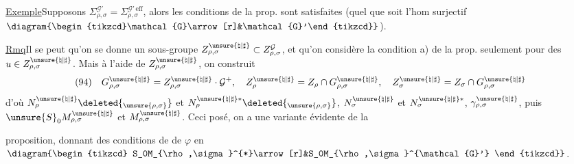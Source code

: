 \uline{Exemple}\quad Supposons
\(\Sigma_{\rho,\sigma}^{\mathcal{G}'}=\Sigma_{\rho,\sigma}^{\mathcal{G}'\,\mathrm{eff}}\),
alors les conditions de la prop. sont 
satisfaites (quel que soit l'hom surjectif
\(\diagram{\begin{tikzcd}\mathcal{G}\arrow[r]&\mathcal{G}'\end{tikzcd}}\)).

\uline{Rmq}\quad Il se peut qu'on se donne un sous-groupe
\(Z_{\rho,\sigma}^{\unsure{\natural|\sharp}}\subset Z_{\rho,\sigma}^{\mathcal{G}}\),
et qu'on considère  la condition a) de la prop.
seulement pour des \(u\in Z_{\rho,\sigma}^{\unsure{\natural|\sharp}}\).
Mais à l'aide de \(Z_{\rho,\sigma}^{\unsure{\natural|\sharp}}\), on construit
\[
(94)\quad
G_{\rho,\sigma}^{\unsure{\natural|\sharp}}=
Z_{\rho,\sigma}^{\unsure{\natural|\sharp}}\cdot\mathcal{G}^+,
\quad Z_\rho^{\unsure{\natural|\sharp}}=Z_\rho\cap G_{\rho,\sigma}^{\unsure{\natural|\sharp}},
\quad Z_\sigma^{\unsure{\natural|\sharp}}=Z_\sigma\cap G_{\rho,\sigma}^{\unsure{\natural|\sharp}}
\]
d'où \(N_\rho^{\unsure{\natural|\sharp}}\deleted{_{\unsure{\rho,\sigma}}}\)
et \(N_\rho^{\unsure{\natural|\sharp}*}\deleted{_{\unsure{\rho,\sigma}}}\),
\(N_\sigma^{\unsure{\natural|\sharp}}\) et
\(N_\sigma^{\unsure{\natural|\sharp}*}\),
\(\gamma_{\rho,\sigma}^{\unsure{\natural|\sharp}}\), puis
\(\unsure{S}_0M_{\rho,\sigma}^{\unsure{\natural|\sharp}}\) et
\(M_{\rho,\sigma}^{\unsure{\natural|\sharp}}\).
Ceci posé, on a une variante évidente de la


proposition, donnant des conditions de  de \(\varphi\) en
\(\diagram{\begin{tikzcd}
S_0M_{\rho,\sigma}^{*}\arrow[r]&S_0M_{\rho,\sigma}^{\mathcal{G}'}
\end{tikzcd}}\).

